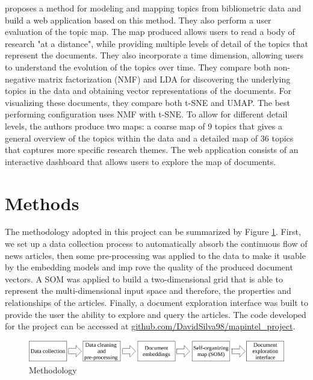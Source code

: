 \documentclass[a4paper]{article}
\begin{document}
\citep{lafia2021a} proposes a method for modeling and mapping topics from bibliometric data and build a web application based on this method. They also perform a user evaluation of the topic map. The map produced allows users to read a body of research "at a distance", while providing multiple levels of detail of the topics that represent the documents. They also incorporate a time dimension, allowing users to understand the evolution of the topics over time. They compare both non-negative matrix factorization (NMF) \citep{lee1999} and LDA for discovering the underlying topics in the data and obtaining vector representations of the documents. For visualizing these documents, they compare both t-SNE and UMAP. The best performing configuration uses NMF with t-SNE. To allow for different detail levels, the authors produce two maps: a coarse map of 9 topics that gives a general overview of the topics within the data and a detailed map of 36 topics that captures more specific research themes. The web application consists of an interactive dashboard that allows users to explore the map of documents.

\section*{Methods}
The methodology adopted in this project can be summarized by Figure \ref{Methodology}. First, we set up a data collection process to automatically absorb the continuous flow of news articles, then some pre-processing was applied to the data to make it usable by the embedding models and imp  rove the quality of the produced document vectors. A SOM was applied to build a two-dimensional grid that is able to represent the multi-dimensional input space and therefore, the properties and relationships of the articles. Finally, a document exploration interface was built to provide the user the ability to explore and query the articles. The code developed for the project can be accessed at \href{https://github.com/DavidSilva98/mapintel_project}{github.com/DavidSilva98/mapintel\_project}.
\begin{figure}[H]
	\centering
	\includegraphics[scale=0.7]{./figures/methodology}
	\caption{Methodology}
	\label{Methodology}
\end{figure}
\end{document}
